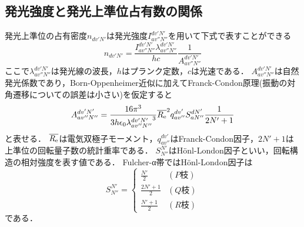 \subsection{発光強度と発光上準位占有数の関係}
発光上準位の占有密度$n_{dv'N'}$は発光強度$I^{dv'N'}_{av''N''}$を用いて下式で表すことができる
\begin{equation}
    n_{dv'N'}=\frac{I^{dv'N'}_{av''N''}\lambda^{dv'N'}_{av''N''}}{hc}\frac{1}{A^{dv'N'}_{av''N''}}
\end{equation}
ここで$\lambda^{dv'N'}_{av''N''}$は発光線の波長，$h$はプランク定数，$c$は光速である．
$A^{dv'N'}_{av''N''}$は自然発光係数であり，Born-Oppenheimer近似に加えてFranck-Condon原理(振動の対角遷移についての誤差は小さい)を仮定すると
\begin{equation}
    A^{dv'N'}_{av''N''} = \frac{16 \pi^3}{3h \epsilon_0 {\lambda^{dv'N'}_{av''N''}}^3 } \overline{R_{\rm e}}^2 q^{dv'}_{av''} S^{dN'}_{aN''} \frac{1}{2N'+1}
\end{equation}
と表せる\cite{PRnoijousei}．
$\overline{R_{\rm e}}$は電気双極子モーメント，$q^{dv'}_{av''}$はFranck-Condon因子，$2N'+1$は上準位の回転量子数の統計重率である．
$S^{N'}_{N''}$はH\"{o}nl-London因子といい，回転構造の相対強度を表す値である．
Fulcher-α帯ではH\"{o}nl-London因子は
\begin{equation}
    S^{N'}_{N''} = \begin{cases}
        \frac{N'}{2} & (P枝)\\
        \frac{2N'+1}{2} & (Q枝)\\
        \frac{N'+1}{2} & (R枝)
    \end{cases}
\end{equation}
である\cite{PRnoijousei}．

